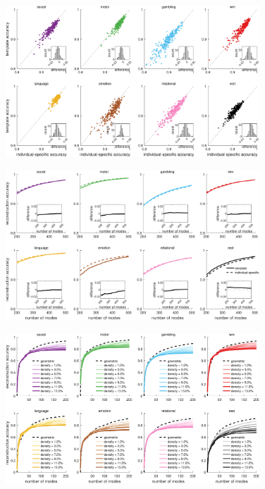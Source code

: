 \documentclass[sn-mathphys-num]{sn-jnl}%
\theoremstyle{thmstyleone}%
\theoremstyle{thmstyletwo}%
\theoremstyle{thmstylethree}%
\begin{document}
\begin{appendices}
\begin{figure}[!htb] 
	\centering
	\includegraphics[width=0.85\textwidth]{fig/supp_4.pdf}
	\caption{} \label{fig:supp_4}
\end{figure}




\begin{figure}[!htb] 
	\centering
	\includegraphics[width=0.85\textwidth]{fig/supp_5.pdf}
	\caption{} \label{fig:supp_5}
\end{figure}


\begin{figure}[!htb] 
	\centering
	\includegraphics[width=0.85\textwidth]{fig/supp_6.pdf}
	\caption{
	} \label{fig:supp_6}
\end{figure}



\end{appendices}
\end{document}
